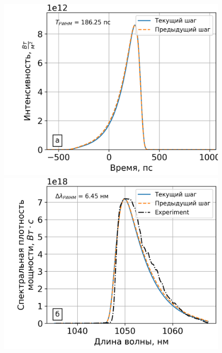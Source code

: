 \documentclass[12pt]{article}
\begin{document}
\begin{figure}[h!]
  \centering
  \begin{minipage}[b]{0.5\textwidth}
    \includegraphics[width=\linewidth]{Images/Gauss Pulse without 15-19/!23. Fiber_pusle}
  \end{minipage}%
  \begin{minipage}[b]{0.5\textwidth}
    \includegraphics[width=\linewidth]{Images/Gauss Pulse without 15-19/!23. Fiber_spectrum}
  \end{minipage}

  \vspace{}


\end{figure}
\end{document}

